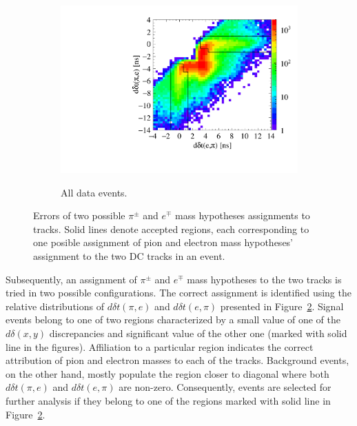 \begin{figure}[h!]
\begin{subfigure}{0.45\textwidth}
  {\includegraphics[width=1.0\textwidth]{Chapter7_analysis_kloe/img/tof2_data}}
  \caption{All data events.}\label{fig:tof_12_t1_4}
  \end{subfigure}
  \caption{Errors of two possible $\pi^{\pm}$ and $e^{\mp}$ mass hypotheses assignments to tracks. Solid lines denote accepted regions, each corresponding to one posible assignment of pion and electron mass hypotheses' assignment to the two DC tracks in an event.}\label{fig:tof_12_t1}
\end{figure}

Subsequently, an assignment of $\pi^{\pm}$ and $e^{\mp}$ mass hypotheses to the two tracks is tried in two possible configurations. The correct assignment is identified using the relative distributions of $d\delta t (\pi,e)$ and $d \delta t(e,\pi)$ presented in Figure~\ref{fig:tof_12_t1}. Signal events belong to one of two regions characterized by a small value of one of the $d\delta(x,y)$ discrepancies and significant value of the other one (marked with solid line in the figures). Affiliation to a particular region indicates the correct attribution of pion and electron masses to each of the tracks. Background events, on the other hand, mostly populate the region closer to diagonal where both $d\delta t(\pi,e)$ and $d\delta t(e,\pi)$ are non-zero. Consequently, events are selected for further analysis if they belong to one of the regions marked with solid line in Figure~\ref{fig:tof_12_t1}.
%
%

